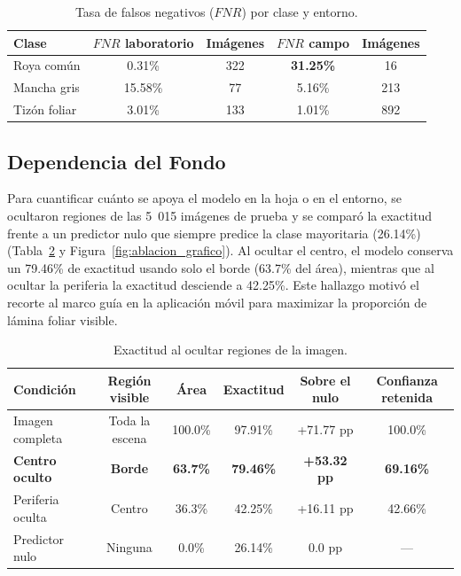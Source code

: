 \begin{table}[H]
\caption{Tasa de falsos negativos ($FNR$) por clase y entorno.}
\label{tab:fnr_c3}
\centering
\small
\begin{singlespace}
\begin{tabular}{lcccc}
\toprule
\textbf{Clase} & \textbf{$FNR$ laboratorio} & \textbf{Im\'agenes} & \textbf{$FNR$ campo} & \textbf{Im\'agenes} \\
\midrule
Roya com\'un & 0.31\% & 322 & \textbf{31.25\%} & 16 \\
Mancha gris & 15.58\% & 77 & 5.16\% & 213 \\
Tiz\'on foliar & 3.01\% & 133 & 1.01\% & 892 \\
\bottomrule
\end{tabular}
\end{singlespace}
\end{table}

\FloatBarrier
\subsection{Dependencia del Fondo}\label{sec:dependencia_fondo}

Para cuantificar cu\'anto se apoya el modelo en la hoja o en el entorno, se ocultaron regiones de las 5~015 im\'agenes de prueba y se compar\'o la exactitud frente a un predictor nulo que siempre predice la clase mayoritaria (26.14\%) (Tabla~\ref{tab:ablacion_c3} y Figura~\ref{fig:ablacion_grafico}). Al ocultar el centro, el modelo conserva un 79.46\% de exactitud usando solo el borde (63.7\% del \'area), mientras que al ocultar la periferia la exactitud desciende a 42.25\%. Este hallazgo motiv\'o el recorte al marco gu\'ia en la aplicaci\'on m\'ovil para maximizar la proporci\'on de l\'amina foliar visible.

\begin{table}[H]
\caption{Exactitud al ocultar regiones de la imagen.}
\label{tab:ablacion_c3}
\centering
\small
\begin{singlespace}
\begin{tabular}{lccccc}
\toprule
\textbf{Condici\'on} & \textbf{Regi\'on visible} & \textbf{\'Area} & \textbf{Exactitud} & \textbf{Sobre el nulo} & \textbf{Confianza retenida} \\
\midrule
Imagen completa & Toda la escena & 100.0\% & 97.91\% & +71.77 pp & 100.0\% \\
\textbf{Centro oculto} & \textbf{Borde} & \textbf{63.7\%} & \textbf{79.46\%} & \textbf{+53.32 pp} & \textbf{69.16\%} \\
Periferia oculta & Centro & 36.3\% & 42.25\% & +16.11 pp & 42.66\% \\
Predictor nulo & Ninguna & 0.0\% & 26.14\% & 0.0 pp & --- \\
\bottomrule
\end{tabular}
\end{singlespace}
\end{table}

